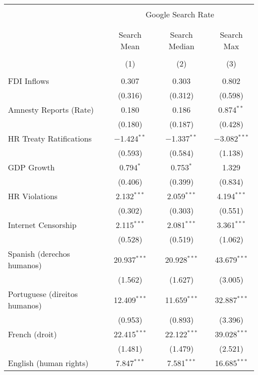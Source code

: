 
\begin{table}[!htbp] \centering 
  \caption{} 
  \label{} 
\begin{tabular}{@{\extracolsep{5pt}}lccc} 
\\[-1.8ex]\hline 
\hline \\[-1.8ex] 
 & \multicolumn{3}{c}{Google Search Rate} \\ 
\cline{2-4} 
\\[-1.8ex] & \multicolumn{3}{c}{ } \\ 
 & Search Mean & Search Median & Search Max \\ 
\\[-1.8ex] & (1) & (2) & (3)\\ 
\hline \\[-1.8ex] 
 FDI Inflows & 0.307 & 0.303 & 0.802 \\ 
  & (0.316) & (0.312) & (0.598) \\ 
  Amnesty Reports (Rate) & 0.180 & 0.186 & 0.874$^{**}$ \\ 
  & (0.180) & (0.187) & (0.428) \\ 
  HR Treaty Ratifications & $-$1.424$^{**}$ & $-$1.337$^{**}$ & $-$3.082$^{***}$ \\ 
  & (0.593) & (0.584) & (1.138) \\ 
  GDP Growth & 0.794$^{*}$ & 0.753$^{*}$ & 1.329 \\ 
  & (0.406) & (0.399) & (0.834) \\ 
  HR Violations & 2.132$^{***}$ & 2.059$^{***}$ & 4.194$^{***}$ \\ 
  & (0.302) & (0.303) & (0.551) \\ 
  Internet Censorship & 2.115$^{***}$ & 2.081$^{***}$ & 3.361$^{***}$ \\ 
  & (0.528) & (0.519) & (1.062) \\ 
  Spanish (derechos humanos) & 20.937$^{***}$ & 20.928$^{***}$ & 43.679$^{***}$ \\ 
  & (1.562) & (1.627) & (3.005) \\ 
  Portuguese (direitos humanos) & 12.409$^{***}$ & 11.659$^{***}$ & 32.887$^{***}$ \\ 
  & (0.953) & (0.893) & (3.396) \\ 
  French (droit) & 22.415$^{***}$ & 22.122$^{***}$ & 39.028$^{***}$ \\ 
  & (1.481) & (1.479) & (2.521) \\ 
  English (human rights) & 7.847$^{***}$ & 7.581$^{***}$ & 16.685$^{***}$ \\ 

\end{tabular}
\end{table}
